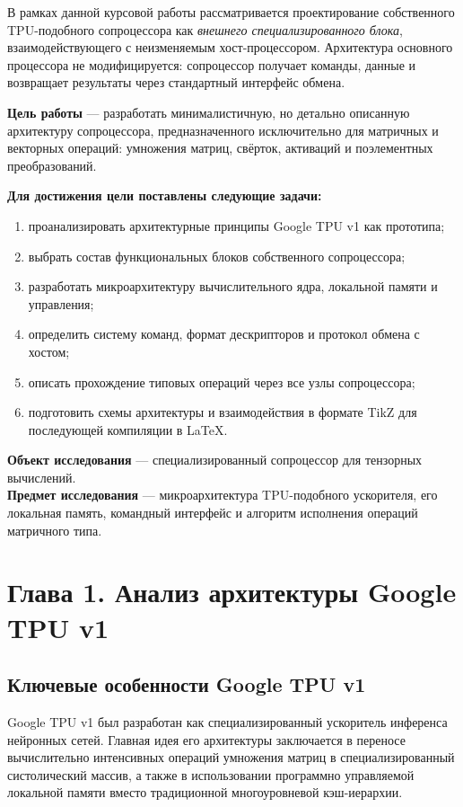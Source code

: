\documentclass[12pt,a4paper]{article}
\begin{document}
В рамках данной курсовой работы рассматривается проектирование собственного TPU-подобного сопроцессора как \textit{внешнего специализированного блока}, взаимодействующего с неизменяемым хост-процессором. Архитектура основного процессора не модифицируется: сопроцессор получает команды, данные и возвращает результаты через стандартный интерфейс обмена.

\textbf{Цель работы} --- разработать минималистичную, но детально описанную архитектуру сопроцессора, предназначенного исключительно для матричных и векторных операций: умножения матриц, свёрток, активаций и поэлементных преобразований.

\textbf{Для достижения цели поставлены следующие задачи:}
\begin{enumerate}
    \item проанализировать архитектурные принципы Google TPU v1 как прототипа;
    \item выбрать состав функциональных блоков собственного сопроцессора;
    \item разработать микроархитектуру вычислительного ядра, локальной памяти и управления;
    \item определить систему команд, формат дескрипторов и протокол обмена с хостом;
    \item описать прохождение типовых операций через все узлы сопроцессора;
    \item подготовить схемы архитектуры и взаимодействия в формате TikZ для последующей компиляции в \LaTeX.
\end{enumerate}

\textbf{Объект исследования} --- специализированный сопроцессор для тензорных вычислений.\\
\textbf{Предмет исследования} --- микроархитектура TPU-подобного ускорителя, его локальная память, командный интерфейс и алгоритм исполнения операций матричного типа.

\section{Глава 1. Анализ архитектуры Google TPU v1}

\subsection{Ключевые особенности Google TPU v1}

Google TPU v1 был разработан как специализированный ускоритель инференса нейронных сетей. Главная идея его архитектуры заключается в переносе вычислительно интенсивных операций умножения матриц в специализированный систолический массив, а также в использовании программно управляемой локальной памяти вместо традиционной многоуровневой кэш-иерархии.
\end{document}
